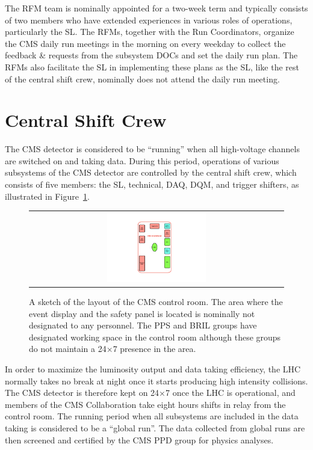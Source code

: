 The \ac{RFM} team is nominally appointed for a two-week term and typically consists of two members who have extended experiences in various roles of operations, particularly the \ac{SL}. The \acp{RFM}, together with the Run Coordinators, organize the \ac{CMS} daily run meetings in the morning on every weekday to collect the feedback \& requests from the subsystem \acp{DOC} and set the daily run plan. The \acp{RFM} also facilitate the \ac{SL} in implementing these plans as the \ac{SL}, like the rest of the central shift crew, nominally does not attend the daily run meeting.

\section{Central Shift Crew}
\label{sec:ControlRoom}

The \ac{CMS} detector is considered to be ``running'' when all high-voltage channels are switched on and taking data. During this period, operations of various subsystems of the \ac{CMS} detector are controlled by the central shift crew, which consists of five members: the \ac{SL}, technical, \ac{DAQ}, \ac{DQM}, and trigger shifters, as illustrated in Figure~\ref{fig:ControlRoom}. 

\begin{figure}[tbh!]
 \begin{center}
 \begin{tabular}{c}
 \includegraphics[width=0.4\textwidth]{figures/Part2/Operation/ControlRoom}
 \end{tabular}
 \caption{A sketch of the layout of the \ac{CMS} control room. The area where the event display and the safety panel is located is nominally not designated to any personnel. The \ac{PPS} and \ac{BRIL} groups have designated working space in the control room although these groups do not maintain a 24$\times$7 presence in the area.}
 \label{fig:ControlRoom}
 \end{center}
\end{figure}

In order to maximize the luminosity output and data taking efficiency, the \ac{LHC} normally takes no break at night once it starts producing high intensity collisions. The \ac{CMS} detector is therefore kept on 24$\times$7 once the \ac{LHC} is operational, and members of the \ac{CMS} Collaboration take eight hours shifts in relay from the control room. The running period when all subsystems are included in the data taking is considered to be a ``global run''. The data collected from global runs are then screened and certified by the \ac{CMS} \ac{PPD} group for physics analyses. 

